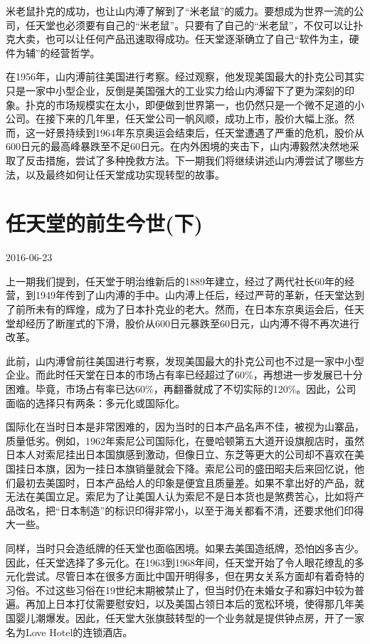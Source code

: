 \documentclass[
  letterpaper,
  DIV=11,
  numbers=noendperiod]{scrreprt}
\begin{document}
米老鼠扑克的成功，也让山内溥了解到了``米老鼠''的威力。要想成为世界一流的公司，任天堂也必须要有自己的``米老鼠''。只要有了自己的``米老鼠''，不仅可以让扑克大卖，也可以让任何产品迅速取得成功。任天堂逐渐确立了自己``软件为主，硬件为辅''的经营哲学。

在1956年，山内溥前往美国进行考察。经过观察，他发现美国最大的扑克公司其实只是一家中小型企业，反倒是美国强大的工业实力给山内溥留下了更为深刻的印象。扑克的市场规模实在太小，即便做到世界第一，也仍然只是一个微不足道的小公司。在接下来的几年里，任天堂公司一帆风顺，成功上市，股价大幅上涨。然而，这一好景持续到1964年东京奥运会结束后，任天堂遭遇了严重的危机，股价从600日元的最高峰暴跌至不足60日元。在内外困境的夹击下，山内溥毅然决然地采取了反击措施，尝试了多种挽救方法。下一期我们将继续讲述山内溥尝试了哪些方法，以及最终如何让任天堂成功实现转型的故事。


\chapter{任天堂的前生今世(下)}\label{ux4efbux5929ux5802ux7684ux524dux751fux4ecaux4e16ux4e0b}

2016-06-23

上一期我们提到，任天堂于明治维新后的1889年建立，经过了两代社长60年的经营，到1949年传到了山内溥的手中。山内溥上任后，经过严苛的革新，任天堂达到了前所未有的辉煌，成为了日本扑克业的老大。然而，在日本东京奥运会后，任天堂却经历了断崖式的下滑，股价从600日元暴跌至60日元，山内溥不得不再次进行改革。

此前，山内溥曾前往美国进行考察，发现美国最大的扑克公司也不过是一家中小型企业。而此时任天堂在日本的市场占有率已经超过了60\%，再想进一步发展已十分困难。毕竟，市场占有率已达60\%，再翻番就成了不切实际的120\%。因此，公司面临的选择只有两条：多元化或国际化。

国际化在当时日本是非常困难的，因为当时的日本产品名声不佳，被视为山寨品，质量低劣。例如，1962年索尼公司国际化，在曼哈顿第五大道开设旗舰店时，虽然日本人对索尼挂出日本国旗感到激动，但像日立、东芝等更大的公司却不喜欢在美国挂日本旗，因为一挂日本旗销量就会下降。索尼公司的盛田昭夫后来回忆说，他们最初去美国时，日本产品给人的印象是便宜且质量差。如果不拿出好的产品，就无法在美国立足。索尼为了让美国人认为索尼不是日本货也是煞费苦心，比如将产品改名，把``日本制造''的标识印得非常小，以至于海关都看不清，还要求他们印得大一些。

同样，当时只会造纸牌的任天堂也面临困境。如果去美国造纸牌，恐怕凶多吉少。因此，任天堂选择了多元化。在1963到1968年间，任天堂开始了令人眼花缭乱的多元化尝试。尽管日本在很多方面比中国开明得多，但在男女关系方面却有着奇特的习俗。不过这些习俗在19世纪末期被禁止了，但当时仍在未婚女子和寡妇中较为普遍。再加上日本打仗需要慰安妇，以及美国占领日本后的宽松环境，使得那几年美国婴儿潮爆发。因此，任天堂大张旗鼓转型的一个业务就是提供钟点房，开了一家名为Love
Hotel的连锁酒店。
\end{document}
